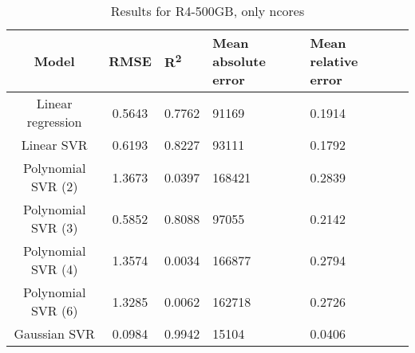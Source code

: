 \begin{table}[H]
\centering
\begin{adjustbox}{center}
\begin{tabular}{c | c M{1.2cm} M{2.5cm} M{2.5cm} M{1.8cm}}
Model & RMSE & R\textsuperscript{2} & Mean absolute error & Mean relative error \tabularnewline
\hline
Linear regression & 0.5643 & 0.7762 &  91169 & 0.1914 \\
Linear SVR & 0.6193 & 0.8227 &  93111 & 0.1792 \\
Polynomial SVR (2) & 1.3673 & 0.0397 & 168421 & 0.2839 \\
Polynomial SVR (3) & 0.5852 & 0.8088 &  97055 & 0.2142 \\
Polynomial SVR (4) & 1.3574 & 0.0034 & 166877 & 0.2794 \\
Polynomial SVR (6) & 1.3285 & 0.0062 & 162718 & 0.2726 \\
Gaussian SVR & 0.0984 & 0.9942 &  15104 & 0.0406 \\
\end{tabular}
\end{adjustbox}
\\
\caption{Results for R4-500GB, only ncores}
\label{tab:only_1_linear_R4_500}
\end{table}
